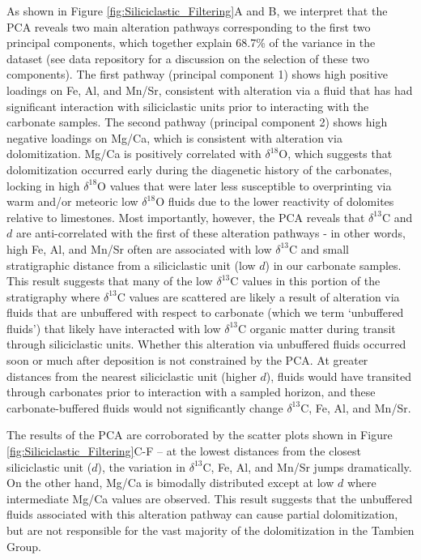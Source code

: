 \documentclass[11pt,letterpaper]{article}
\newcommand{\dC}{$\delta^{13}$C\xspace}
\newcommand{\dO}{$\delta^{18}$O\xspace}
\newcommand{\dsil}{$d$\xspace}
\begin{document}
As shown in Figure \ref{fig:Siliciclastic_Filtering}A and B, we interpret that the PCA reveals two main alteration pathways corresponding to the first two principal components, which together explain 68.7\% of the variance in the dataset (see data repository for a discussion on the selection of these two components). The first pathway (principal component 1) shows high positive loadings on Fe, Al, and Mn/Sr, consistent with alteration via a fluid that has had significant interaction with siliciclastic units prior to interacting with the carbonate samples. The second pathway (principal component 2) shows high negative loadings on Mg/Ca, which is consistent with alteration via dolomitization. Mg/Ca is positively correlated with \dO, which suggests that dolomitization occurred early during the diagenetic history of the carbonates, locking in high \dO values that were later less susceptible to overprinting via warm and/or meteoric low \dO fluids due to the lower reactivity of dolomites relative to limestones. Most importantly, however, the PCA reveals that \dC and \dsil are anti-correlated with the first of these alteration pathways - in other words, high Fe, Al, and Mn/Sr often are associated with low \dC and small stratigraphic distance from a siliciclastic unit (low \dsil) in our carbonate samples. This result suggests that many of the low \dC values in this portion of the stratigraphy where \dC values are scattered are likely a result of alteration via fluids that are unbuffered with respect to carbonate (which we term `unbuffered fluids') that likely have interacted with low \dC organic matter during transit through siliciclastic units. Whether this alteration via unbuffered fluids occurred soon or much after deposition is not constrained by the PCA. At greater distances from the nearest siliciclastic unit (higher \dsil), fluids would have transited through carbonates prior to interaction with a sampled horizon, and these carbonate-buffered fluids would not significantly change \dC, Fe, Al, and Mn/Sr.

The results of the PCA are corroborated by the scatter plots shown in Figure \ref{fig:Siliciclastic_Filtering}C-F -- at the lowest distances from the closest siliciclastic unit (\dsil), the variation in \dC, Fe, Al, and Mn/Sr jumps dramatically. On the other hand, Mg/Ca is bimodally distributed except at low \dsil where intermediate Mg/Ca values are observed. This result suggests that the unbuffered fluids associated with this alteration pathway can cause partial dolomitization, but are not responsible for the vast majority of the dolomitization in the Tambien Group.
\end{document}
